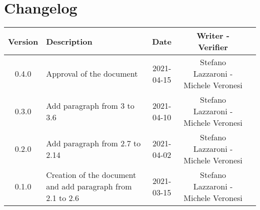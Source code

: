 \section*{Changelog}

\begin{center}
	\begin{longtable}{|c|p{5cm}|c|c|c|}
	\hline
	\rowcolor{lighter-grayer}
	\textbf{Version} & \textbf{Description} & \textbf{Date} & \textbf{Writer - Verifier} \\
	\hline
	\endfirsthead


	\hline
	0.4.0 & Approval of the document & 2021-04-15 & Stefano Lazzaroni - Michele Veronesi\\
	0.3.0 & Add paragraph from 3 to 3.6 & 2021-04-10 & Stefano Lazzaroni - Michele Veronesi\\
	0.2.0 & Add paragraph from 2.7 to 2.14 & 2021-04-02 & Stefano Lazzaroni - Michele Veronesi\\
	0.1.0 & Creation of the document and add paragraph from 2.1 to 2.6  & 2021-03-15 & Stefano Lazzaroni - Michele Veronesi\\
	\hline

	\end{longtable}
\end{center}